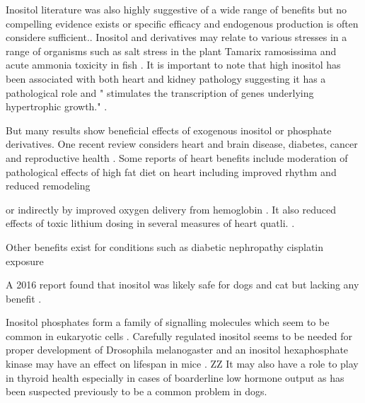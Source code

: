 Inositol literature was also highly suggestive of a wide range of
benefits but no compelling evidence exists or specific efficacy
and endogenous production is often considere sufficient..
Inositol and derivatives may relate to various stresses in a range
of organisms such as salt stress in the plant Tamarix ramosissima
\cite{Li_Fan_Zhang_Effects_Inositol_2023}
and acute ammonia toxicity in fish 
\cite{Wang_Meng_Liu_Exogenous_inositol_ameliorates_2021}.
It is  important to note that high inositol has been
associated with both heart and kidney pathology suggesting
it has a pathological role \cite{Pouleur_Menghoum_Cumps_Plasma_inositol_elevation_2024} 
and " stimulates the transcription of genes underlying hypertrophic growth."
\cite{Demydenko_EkhteraeiTousi_Roderick_Inositol_2022}.

But many results show beneficial effects of exogenous
inositol or phosphate derivatives.
One recent review considers heart and brain disease, diabetes, 
cancer and reproductive health \cite{Chhetri_Inositol_2019}.
Some reports of heart benefits   include
moderation of pathological effects of high fat diet
on heart including improved rhythm and reduced remodeling
\cite{LABBATE2020105047}

or indirectly by improved oxygen delivery from hemoglobin
\cite{Biolo_Greferath_Siwik_Enhanced_exercise_capacity_2009}
. It also reduced effects of toxic lithium dosing
in several measures of heart quatli. \cite{LABBATE2024117287}.



Other  benefits exist for conditions such as 
diabetic nephropathy
\cite{https://doi.org/10.1002/jbt.23032}
cisplatin exposure \cite{Xie_Wang_Li_Role_inositol_2023}
\cite{Qi_Deng_Wang_Inositol_Supplementation_Alleviates_2023} 

A 2016 report found that inositol was likely safe for
dogs and cat but lacking any benefit
\cite{https://doi.org/10.2903/j.efsa.2016.4511}.


Inositol phosphates form a family of  signalling
molecules which seem to be common in eukaryotic cells
\cite{Laha_PortelaTorres_Desfougeres_Inositol_phosphate_kinases_2021}
.
Carefully regulated inositol seems to be needed for
proper development of Drosophila melanogaster \cite{PMC8565467}
and an inositol hexaphosphate kinase may have an effect on
lifespan in mice \cite{Moritoh_Oka_Yasuhara_Inositol_Hexakisphosphate_Kinase_2016}.
ZZ
It may also have a role to play in thyroid health especially in 
cases of boarderline low hormone output 
\cite{PMC8143049} as has been suspected previously to be a common
problem in dogs. 


